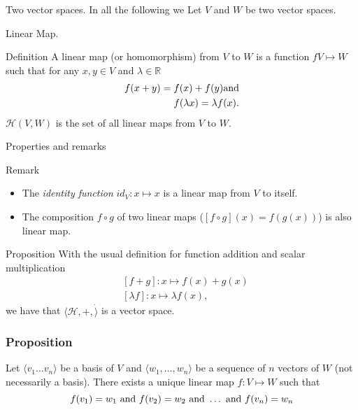 \documentclass{beamer}
\begin{document}
\begin{frame}{Two vector spaces.}
  In all the following we Let $V$ and $W$ be two vector spaces.
\end{frame}

\begin{frame}{Linear Map.}
  \begin{block}{Definition}
    A linear map (or homomorphism) from $V$ to $W$ is a function $f V \mapsto W$ such that for any $x, y \in V$ and $\lambda \in \mathbb{R}$
    \[\begin{aligned}
    f(x + y) = f(x) + f(y) \textnormal{and}\\
    f(\lambda x) = \lambda f(x).
    \end{aligned}\]
    $\mathcal{H}(V, W)$ is the set of all linear maps from $V$ to $W$.
  \end{block}
\end{frame}

\begin{frame}{Properties and remarks}
  \begin{block}{Remark}
    \begin{itemize}
    \item The \emph{identity function} $id_{V}: x \mapsto x$ is a linear map from $V$ to itself.
    \item The composition $f \circ g$ of two linear maps ($[f \circ g](x) = f(g(x))$) is also linear map.
    \end{itemize}
  \end{block}

  \begin{block}{Proposition}
    With the usual definition for function addition and scalar multiplication
    \[\begin{aligned}
    &[f + g] : x \mapsto f(x) + g(x)\\
    &[\lambda f] : x \mapsto \lambda f(x),
    \end{aligned}\]
    we have that $\langle \mathcal{H}, +, \dot  \rangle$ is a vector space.
  \end{block}
\end{frame}

\begin{frame}
  \frametitle{Proposition}
  Let $\langle v_1 \dots v_n \rangle$ be a basis of $V$ and $\langle w_1, \dots, w_n \rangle$ be a sequence of $n$ vectors of $W$ (not necessarily a basis). There exists a unique linear map $f: V \mapsto W$ such that
  \[f(v_1) = w_1 \textnormal{ and } f(v_2) = w_2 \textnormal{ and } \dots \textnormal{ and } f(v_n) = w_n\]
\end{frame}
\end{document}
